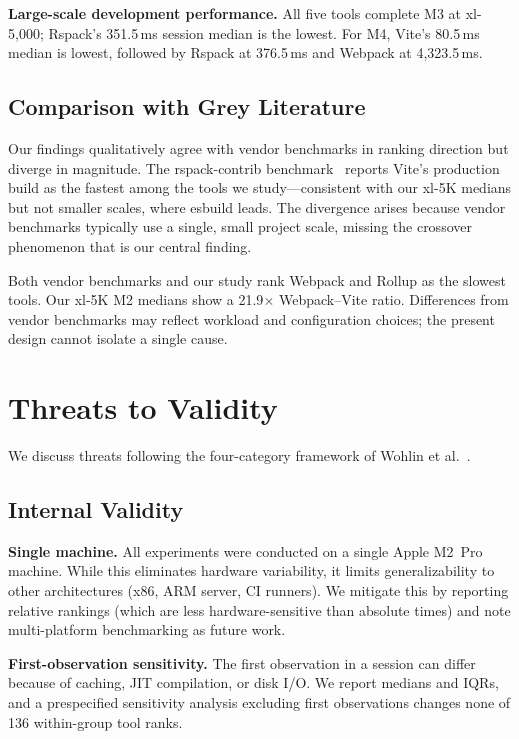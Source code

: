 \documentclass[preprint,12pt]{elsarticle}
\begin{document}
\textbf{Large-scale development performance.}
All five tools complete M3 at xl-5{,}000; Rspack's 351.5\,ms session median is the lowest.
For M4, Vite's 80.5\,ms median is lowest, followed by Rspack at 376.5\,ms and Webpack at 4{,}323.5\,ms.

\subsection{Comparison with Grey Literature}\label{sec:grey}

Our findings qualitatively agree with vendor benchmarks in ranking direction but diverge in magnitude.
The rspack-contrib benchmark~\cite{rspackbench2026} reports Vite's production build as the fastest among the tools we study---consistent with our xl-5K medians but not smaller scales, where esbuild leads.
The divergence arises because vendor benchmarks typically use a single, small project scale, missing the crossover phenomenon that is our central finding.

Both vendor benchmarks and our study rank Webpack and Rollup as the slowest tools.
Our xl-5K M2 medians show a 21.9$\times$ Webpack--Vite ratio.
Differences from vendor benchmarks may reflect workload and configuration choices; the present design cannot isolate a single cause.

\section{Threats to Validity}\label{sec:threats}

We discuss threats following the four-category framework of Wohlin et al.~\cite{wohlin2012experimentation}.

\subsection{Internal Validity}

\textbf{Single machine.}
All experiments were conducted on a single Apple M2~Pro machine.
While this eliminates hardware variability, it limits generalizability to other architectures (x86, ARM server, CI runners).
We mitigate this by reporting relative rankings (which are less hardware-sensitive than absolute times) and note multi-platform benchmarking as future work.

\textbf{First-observation sensitivity.}
The first observation in a session can differ because of caching, JIT compilation, or disk I/O.
We report medians and IQRs, and a prespecified sensitivity analysis excluding first observations changes none of 136 within-group tool ranks.
\end{document}
